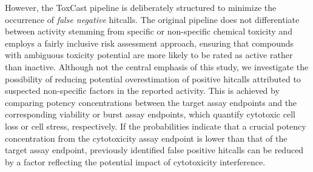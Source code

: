 However, the ToxCast pipeline is deliberately structured to minimize the occurrence of \emph{false negative} hitcalls. The original pipeline does not differentiate between activity stemming from specific or non-specific chemical toxicity and employs a fairly inclusive risk assessment approach, ensuring that compounds with ambiguous toxicity potential are more likely to be rated as active rather than inactive.
Although not the central emphasis of this study, we investigate the possibility of reducing potential overestimation of positive hitcalls attributed to suspected non-specific factors in the reported activity. This is achieved by comparing potency concentrations between the target assay endpoints and the corresponding viability or burst assay endpoints, which quantify cytotoxic cell loss or cell stress, respectively. If the probabilities indicate that a crucial potency concentration from the cytotoxicity assay endpoint is lower than that of the target assay endpoint, previously identified false positive hitcalls can be reduced by a factor reflecting the potential impact of cytotoxicity interference.






